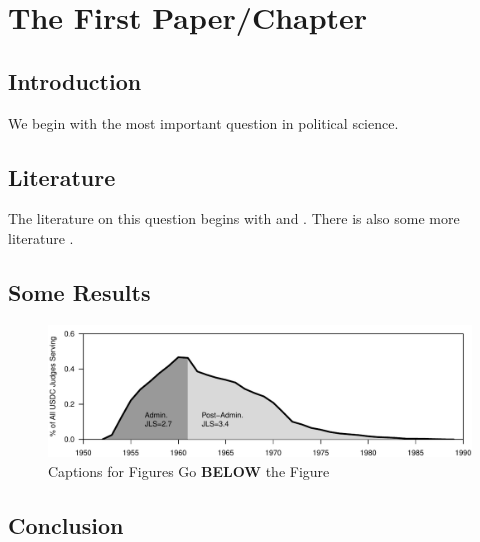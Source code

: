 \chapter{The First Paper/Chapter}

\section{Introduction}

We begin with the most important question in political science. \lipsum[1]

\section{Literature}

The literature on this question begins with  \citet{tocqueville1838} and \citet{wilson1885}. There is also some more literature \citep{downs1957,baron1989,cox1993,krehbiel1998}. \lipsum[2]

\section{Some Results}

\lipsum[3] 



\lipsum[4]

\begin{figure}[htbp]
   \centering
   \includegraphics[width=\textwidth]{figures/example_figure.pdf}
   
\caption{Captions for Figures Go \textbf{BELOW} the Figure}
\end{figure}

\lipsum[5]

\section{Conclusion}
\lipsum[6-7] 